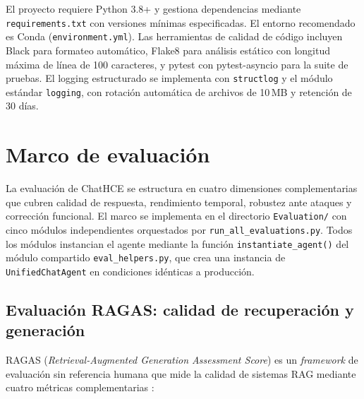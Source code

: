 El proyecto requiere Python 3.8+ y gestiona dependencias mediante
\texttt{requirements.txt} con versiones mínimas especificadas.
El entorno recomendado es Conda (\texttt{environment.yml}).
Las herramientas de calidad de código incluyen Black para formateo automático,
Flake8 para análisis estático con longitud máxima de línea de 100 caracteres,
y pytest con pytest-asyncio para la suite de pruebas.
El logging estructurado se implementa con \texttt{structlog} y el módulo
estándar \texttt{logging}, con rotación automática de archivos de 10\,MB
y retención de 30 días.


\section{Marco de evaluación}
\label{sec:evaluacion}

La evaluación de ChatHCE se estructura en cuatro dimensiones complementarias
que cubren calidad de respuesta, rendimiento temporal, robustez ante ataques
y corrección funcional. El marco se implementa en el directorio
\texttt{Evaluation/} con cinco módulos independientes orquestados por
\texttt{run\_all\_evaluations.py}. Todos los módulos instancian el agente
mediante la función \texttt{instantiate\_agent()} del módulo compartido
\texttt{eval\_helpers.py}, que crea una instancia de \texttt{UnifiedChatAgent}
en condiciones idénticas a producción.

\subsection{Evaluación RAGAS: calidad de recuperación y generación}
\label{sec:eval_ragas}

RAGAS (\textit{Retrieval-Augmented Generation Assessment Score}) es un
\textit{framework} de evaluación sin referencia humana que mide la calidad
de sistemas RAG mediante cuatro métricas complementarias
\cite{es2023ragas}:

